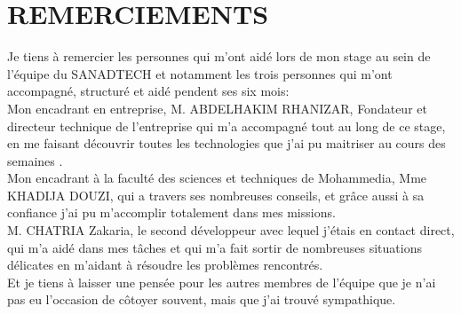 \documentclass[11pt, oneside]{Thesis} %
\begin{document}
\clearpage %



\clearpage %

\clearpage %
\chapter*{REMERCIEMENTS}


Je tiens à remercier les personnes qui m'ont aidé lors de mon stage au sein de l'équipe du SANADTECH et notamment les trois personnes qui m'ont accompagné, structuré et aidé pendent ses six mois:\\[0.5cm]
Mon encadrant en entreprise, M. ABDELHAKIM RHANIZAR, Fondateur et directeur technique de l'entreprise qui m'a accompagné tout au long de ce stage, en me faisant découvrir toutes les technologies que j'ai pu maitriser au cours des semaines . \\
Mon encadrant à la faculté des sciences et techniques de Mohammedia, Mme KHADIJA DOUZI, qui a travers ses nombreuses conseils, et grâce aussi à sa confiance j'ai pu m'accomplir totalement dans mes missions.\\
M. CHATRIA Zakaria, le second développeur avec lequel j'étais en contact direct, qui m'a aidé dans mes tâches et qui m'a fait sortir de nombreuses situations délicates en m'aidant à résoudre les problèmes rencontrés.\\[0.2cm]
Et je tiens à laisser une pensée pour les autres membres de l’équipe que je n’ai pas eu l’occasion de côtoyer souvent, mais que j’ai trouvé sympathique.



%

\clearpage %


\clearpage %
\end{document}
